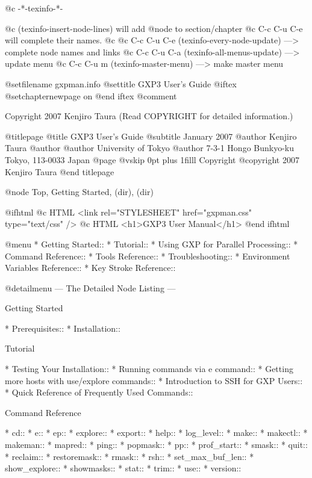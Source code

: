   @c -*-texinfo-*-

@c (texinfo-insert-node-lines) will add @node to section/chapter
@c C-c C-u C-e will complete their names.
@c 
@c C-c C-u C-e  (texinfo-every-node-update) ---> complete node names and links
@c C-c C-u C-a  (texinfo-all-menus-update)  ---> update menu
@c C-c C-u m    (texinfo-master-menu)       ---> make master menu

@setfilename gxpman.info
@settitle GXP3 User's Guide
@iftex
@setchapternewpage on
@end iftex
@comment %


Copyright 2007 Kenjiro Taura (Read COPYRIGHT for detailed information.)


@titlepage
@title GXP3 User's Guide
@subtitle January 2007
@author Kenjiro Taura
@author
@author University of Tokyo
@author 7-3-1 Hongo Bunkyo-ku Tokyo, 113-0033 Japan
@page
@vskip 0pt plus 1filll
Copyright @copyright{} 2007 Kenjiro Taura
@end titlepage

@node Top, Getting Started, (dir), (dir)

@ifhtml
@c HTML <link rel="STYLESHEET" href="gxpman.css" type="text/css" />
@c HTML <h1>GXP3 User Manual</h1>
@end ifhtml

@menu
* Getting Started::             
* Tutorial::                    
* Using GXP for Parallel Processing::  
* Command Reference::           
* Tools Reference::             
* Troubleshooting::             
* Environment Variables Reference::  
* Key Stroke Reference::        

@detailmenu
 --- The Detailed Node Listing ---

Getting Started

* Prerequisites::               
* Installation::                

Tutorial

* Testing Your Installation::   
* Running commands via e command::  
* Getting more hosts with use/explore commands::  
* Introduction to SSH for GXP Users::  
* Quick Reference of Frequently Used Commands::  

Command Reference

* cd::                          
* e::                           
* ep::                          
* explore::                     
* export::                      
* help::                        
* log_level::                   
* make::                        
* makectl::                     
* makeman::                     
* mapred::                      
* ping::                        
* popmask::                     
* pp::                          
* prof_start::                  
* smask::                       
* quit::                        
* reclaim::                     
* restoremask::                 
* rmask::                       
* rsh::                         
* set_max_buf_len::             
* show_explore::                
* showmasks::                   
* stat::                        
* trim::                        
* use::                         
* version::                     

